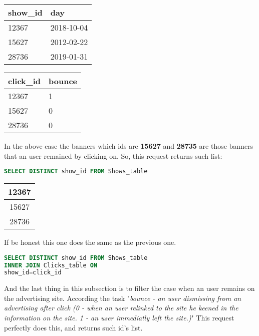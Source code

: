 \documentclass[14pt, a4paper]{extarticle}
\begin{document}
\begin{enumerate}
\begin{minipage}{.3\linewidth}
    \begin{tabular}{|l|l|}
        \hline
        show\_id & day        \\ \hline
        \cellcolor[HTML]{3FBFB8} 12367    & 2018-10-04 \\ \hline
        \cellcolor[HTML]{BF3F41} 15627    & 2012-02-22 \\ \hline
        \cellcolor[HTML]{D9DD1C} 28736    & 2019-01-31 \\ \hline
    \end{tabular}
\end{minipage}
\begin{minipage}{.3\linewidth}
    \begin{tabular}{|l|l|}
        \hline
        click\_id & bounce	\\ \hline
        \cellcolor[HTML]{3FBFB8} 12367 	   & \cellcolor[HTML]{D60E0E} 1       \\ \hline
        \cellcolor[HTML]{BF3F41} 15627 	   & \cellcolor[HTML]{4CDD1C} 0       \\ \hline
        \cellcolor[HTML]{D9DD1C} 28736     & \cellcolor[HTML]{4CDD1C} 0		\\ \hline	
    \end{tabular}
\end{minipage}

In the above case the banners which ids are \textbf{15627} and \textbf{28735}
are those banners that an user remained by clicking on.
So, this request returns such list:

\begin{lstlisting}[language=SQL]
SELECT DISTINCT show_id FROM Shows_table 
\end{lstlisting}


\begin{tabular}{|c|}
    \hline
    12367 \\ \hline
    15627 \\ \hline
    28736 \\ \hline
\end{tabular}

If be honest this one does the same as the previous one.

\begin{lstlisting}[language=SQL]
SELECT DISTINCT show_id FROM Shows_table 
INNER JOIN Clicks_table ON
show_id=click_id
\end{lstlisting}

And the last thing in this subsection is to filter the case when an user remains
on the advertising site. According the task "\emph{bounce - an user dismissing from an advertising after click (0 - when an user relinked to the site 
he keened in the information on the site. 1 - an user immediatly left the site.)}"
This request perfectly does this, and returns such id's list.


\end{enumerate}
\end{document}
